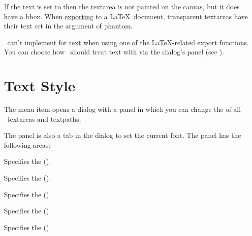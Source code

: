 \begin{information}
If the text  is set to 
then the \gls{textarea} is not painted on the canvas, but it does
have a \gls{bbox}. When \hyperref[sec:exportimage]{exporting} to a
\LaTeX\ document, \gls{transparent} \glspl*{textarea} have their
text set in the argument of \gls{phantom}.
\end{information}

\FlowframTk\ can't implement  for text when
using one of the \LaTeX-related export functions. You can choose
how \FlowframTk\ should treat text with  via the
 dialog's  panel 
(see ).


\section{Text Style}\label{sec:textstyle}


The  menu item opens a dialog
with a  panel in which
you can change the  
of all \selected\ \glspl{textarea} and \glspl{textpath}.


The  panel is also a tab
in the  dialog to set the current
\gls{font}. The panel has the following areas:
\begin{deflist}
\begin{itemdesc}
Specifies the  ().
\end{itemdesc}

\begin{itemdesc}
Specifies the  ().
\end{itemdesc}

\begin{itemdesc}
Specifies the  ().
\end{itemdesc}

\begin{itemdesc}
Specifies the  ().
\end{itemdesc}

\begin{itemdesc}
Specifies the  ().
\end{itemdesc}

\end{deflist}

